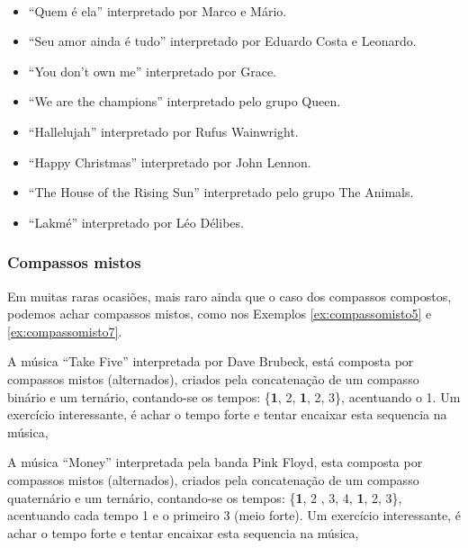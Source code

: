 \begin{example}
\label{ex:compassocomposto6b}
~
\begin{itemize}
\item ``Quem é ela'' interpretado por Marco e Mário.
\item ``Seu amor ainda é tudo'' interpretado por Eduardo Costa e Leonardo.
\item ``You don't own me'' interpretado por Grace.
\item ``We are the champions'' interpretado pelo grupo Queen.
\item ``Hallelujah'' interpretado por Rufus Wainwright.
\item ``Happy Christmas'' interpretado por John Lennon.
\item ``The House of the Rising Sun'' interpretado pelo grupo  The Animals.
\item ``Lakmé'' interpretado por Léo Délibes.
\end{itemize}
\end{example}

\subsubsection{Compassos mistos}
Em muitas raras ocasiões, mais raro ainda que o caso dos compassos compostos, 
podemos achar compassos mistos, como nos Exemplos \ref{ex:compassomisto5} e \ref{ex:compassomisto7}.

\begin{example}
\label{ex:compassomisto5}
A música ``Take Five'' interpretada por  Dave Brubeck,
está composta por compassos mistos (alternados), criados pela concatenação de um compasso binário e um ternário,
contando-se os tempos: \{\textbf{1}, 2, \textbf{1}, 2, 3\}, acentuando o 1.
Um exercício interessante, é achar o tempo forte  e tentar encaixar esta sequencia na música, 
\end{example}

\begin{example}
\label{ex:compassomisto7}
A música ``Money'' interpretada pela banda  Pink Floyd,
esta composta por compassos mistos (alternados), criados pela concatenação de um compasso quaternário e um ternário,
contando-se os tempos: \{\textbf{1}, 2 , 3, 4, \textbf{1}, 2, 3\}, acentuando cada tempo 1 e o primeiro 3 (meio forte).
Um exercício interessante, é achar o tempo forte  e tentar encaixar esta sequencia na música, 
\end{example}
